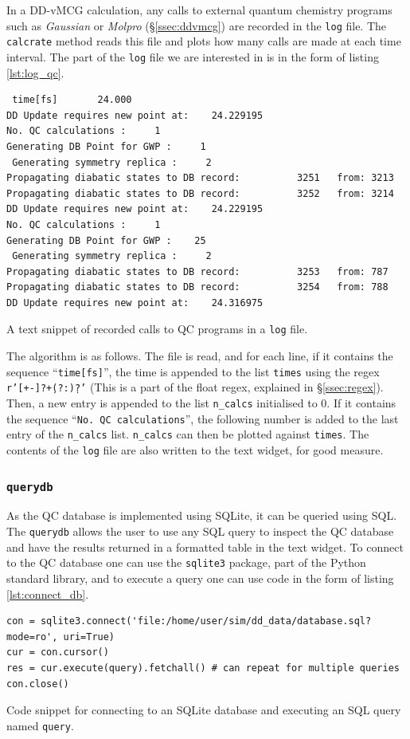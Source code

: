 \documentclass[12pt]{article}
\newenvironment{code}{\captionsetup{type=listing}}{\par\addvspace{\baselineskip}}
\begin{document}
In a DD-vMCG calculation, any calls to external quantum chemistry programs such as \textit{Gaussian} or \textit{Molpro} (\S\ref{ssec:ddvmcg}) are recorded in the \texttt{log} file. The \texttt{calcrate} method reads this file and plots how many calls are made at each time interval. The part of the \texttt{log} file we are interested in is in the form of listing \ref{lst:log_qc}.
\begin{code}\begin{verbatim}
 time[fs]       24.000
DD Update requires new point at:    24.229195
No. QC calculations :     1
Generating DB Point for GWP :     1
 Generating symmetry replica :     2
Propagating diabatic states to DB record:          3251   from: 3213
Propagating diabatic states to DB record:          3252   from: 3214
DD Update requires new point at:    24.229195
No. QC calculations :     1
Generating DB Point for GWP :    25
 Generating symmetry replica :     2
Propagating diabatic states to DB record:          3253   from: 787
Propagating diabatic states to DB record:          3254   from: 788
DD Update requires new point at:    24.316975
\end{verbatim}
\caption{A text snippet of recorded calls to QC programs in a \texttt{log} file.}
\label{lst:log_qc}
\end{code}
The algorithm is as follows. The file is read, and for each line, if it contains the sequence ``\texttt{time[fs]}'', the time is appended to the list \texttt{times} using the regex \texttt{r'[+-]?\d+(?:\.\d*)?'} (This is a part of the float regex, explained in \S\ref{ssec:regex}). Then, a new entry is appended to the list \texttt{n\_calcs} initialised to 0. If it contains the sequence ``\texttt{No. QC calculations}'', the following number is added to the last entry of the \texttt{n\_calcs} list. \texttt{n\_calcs} can then be plotted against \texttt{times}. The contents of the \texttt{log} file are also written to the text widget, for good measure.

\subsubsection{\texttt{querydb}}\label{sssec:querydb}

As the QC database is implemented using SQLite, it can be queried using SQL. The \texttt{querydb} allows the user to use any SQL query to inspect the QC database and have the results returned in a formatted table in the text widget. To connect to the QC database one can use the \texttt{sqlite3} package, part of the Python standard library, and to execute a query one can use code in the form of listing \ref{lst:connect_db}.
\begin{code}\begin{verbatim}
con = sqlite3.connect('file:/home/user/sim/dd_data/database.sql?mode=ro', uri=True)
cur = con.cursor()
res = cur.execute(query).fetchall() # can repeat for multiple queries
con.close()
\end{verbatim}
\caption{Code snippet for connecting to an SQLite database and executing an SQL query named \texttt{query}.}
\label{lst:connect_db}
\end{code}
\end{document}
